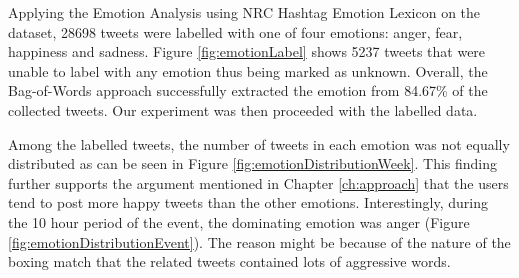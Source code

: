 Applying the Emotion Analysis using NRC Hashtag Emotion Lexicon \citep{mohammad2014using} on the dataset, 28698 tweets were labelled with one of four emotions: anger, fear, happiness and sadness. Figure \ref{fig:emotionLabel} shows 5237 tweets that were unable to label with any emotion thus being marked as unknown. Overall, the Bag-of-Words approach successfully extracted the emotion from 84.67\% of the collected tweets. Our experiment was then proceeded with the labelled data.

Among the labelled tweets, the number of tweets in each emotion was not equally distributed as can be seen in Figure \ref{fig:emotionDistributionWeek}. This finding further supports the argument mentioned in Chapter \ref{ch:approach} that the users tend to post more happy tweets than the other emotions. Interestingly, during the 10 hour period of the event, the dominating emotion was anger (Figure \ref{fig:emotionDistributionEvent}). The reason might be because of the nature of the boxing match that the related tweets contained lots of aggressive words.

